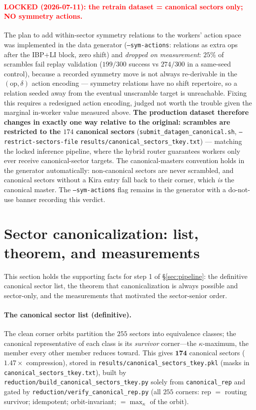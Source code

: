 \documentclass[11pt]{article}
\newcommand{\kk}{\kappa}
\newcommand{\code}[1]{\texttt{#1}}
\begin{document}
\paragraph{\textcolor{red}{LOCKED (2026-07-11): the retrain dataset = canonical
sectors only; NO symmetry actions.}} The plan to add within-sector symmetry relations
to the workers' action space was implemented in the data generator
(\code{--sym-actions}: relations as extra ops after the IBP$+$LI block, zero shift)
and \emph{dropped on measurement}: $25\%$ of scrambles fail replay validation
($199/300$ success vs $274/300$ in a same-seed control), because a recorded symmetry
move is not always re-derivable in the $(\mathrm{op},\delta)$ action encoding ---
symmetry relations have no shift repertoire, so a relation seeded away from the
eventual unscramble target is unreachable. Fixing this requires a redesigned action
encoding, judged not worth the trouble given the marginal in-worker value measured
above. \textbf{The production dataset therefore changes in exactly one way relative
to the original: scrambles are restricted to the $174$ canonical sectors}
(\code{submit\_datagen\_canonical.sh}, \code{--restrict-sectors-file}
\code{results/canonical\_sectors\_tkey.txt}) --- matching the locked inference
pipeline, where the hybrid router guarantees workers only ever receive
canonical-sector targets. The canonical-masters convention holds in the generator
automatically: non-canonical sectors are never scrambled, and canonical sectors
without a Kira entry fall back to their corner, which \emph{is} the canonical master.
The \code{--sym-actions} flag remains in the generator with a do-not-use banner
recording this verdict.

\section{Sector canonicalization: list, theorem, and measurements}
\label{sec:canonicalization}
This section holds the supporting facts for step 1 of \S\ref{sec:pipeline}: the
definitive canonical sector list, the theorem that canonicalization is always possible
and sector-only, and the measurements that motivated the sector-senior order.

\paragraph{The canonical sector list (definitive).} The clean corner orbits partition
the $255$ sectors into equivalence classes; the canonical representative of each class
is its \emph{survivor} corner---the $\kk$-maximum, the member every other member
reduces toward. This gives $\mathbf{174}$ canonical sectors ($1.47\times$ compression),
stored in \code{results/canonical\_sectors\_tkey.pkl} (masks in
\code{canonical\_sectors\_tkey.txt}), built by
\code{reduction/build\_canonical\_sectors\_tkey.py} solely from
\code{canonical\_rep} and gated by \code{reduction/verify\_canonical\_rep.py}
(all $255$ corners: rep $=$ routing survivor; idempotent; orbit-invariant;
$=\max_\kk$ of the orbit).
\end{document}

